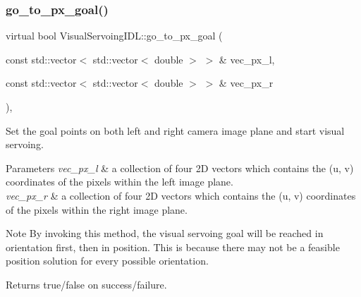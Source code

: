 \mbox{\label{classVisualServoingIDL_a75929f915651161c43ed032e9f69a361}} 
\subsubsection{\texorpdfstring{go\+\_\+to\+\_\+px\+\_\+goal()}{go\_to\_px\_goal()}\hspace{0.1cm}{\footnotesize\ttfamily [1/2]}}
{\footnotesize\ttfamily virtual bool Visual\+Servoing\+I\+D\+L\+::go\+\_\+to\+\_\+px\+\_\+goal (\begin{DoxyParamCaption}\item[{const std\+::vector$<$ std\+::vector$<$ double $>$ $>$ \&}]{vec\+\_\+px\+\_\+l,  }\item[{const std\+::vector$<$ std\+::vector$<$ double $>$ $>$ \&}]{vec\+\_\+px\+\_\+r }\end{DoxyParamCaption})\hspace{0.3cm}{\ttfamily [virtual]}, {\ttfamily [inherited]}}



Set the goal points on both left and right camera image plane and start visual servoing. 


\begin{DoxyParams}{Parameters}
{\em vec\+\_\+px\+\_\+l} & a collection of four 2D vectors which contains the (u, v) coordinates of the pixels within the left image plane. \\
\hline
{\em vec\+\_\+px\+\_\+r} & a collection of four 2D vectors which contains the (u, v) coordinates of the pixels within the right image plane. \\
\hline
\end{DoxyParams}
\begin{DoxyNote}{Note}
By invoking this method, the visual servoing goal will be reached in orientation first, then in position. This is because there may not be a feasible position solution for every possible orientation. 
\end{DoxyNote}
\begin{DoxyReturn}{Returns}
true/false on success/failure. 
\end{DoxyReturn}
\mbox{\label{classVisualServoingServer_a6b68da9fe211a5779fc7a24e406dc8f0}} 
